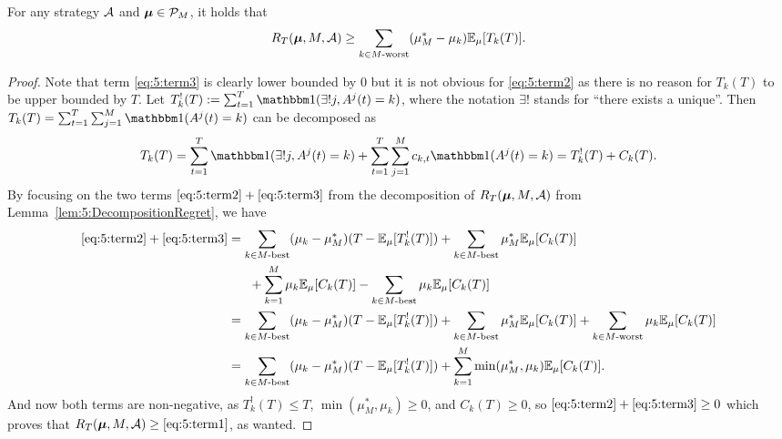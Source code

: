 \begin{lemma}\label{lem:5:1stLowerBound}
\begin{leftbar}[lemmabar]  %
    For any strategy $\mathcal{A}$ and $\boldsymbol{\mu}\in\mathcal{P}_M$, it holds that
    \begin{align*}
        R_T(\boldsymbol{\mu}, M, \mathcal{A})    \geq \sum\limits_{k \in M\text{-}\mathrm{worst}} (\mu_M^*- \mu_k) \mathbb{E}_{\mu}[T_k(T)].
    \end{align*}
\end{leftbar}  %
\end{lemma}

\begin{proof}
  Note that term \ref{eq:5:term3} is clearly lower bounded by $0$
  but it is not obvious for \ref{eq:5:term2} as there is no reason for $T_k(T)$ to be upper bounded by $T$.
  Let $T_k^{!}(T) := \sum_{t=1}^{T} \indic(\exists! j, A^j(t)=k)$,
  where the notation $\exists!$ stands for ``there exists a unique''.
  Then $T_k(T) = \sum_{t=1}^{T} \sum_{j=1}^{M} \indic(A^j(t) = k)$ can be decomposed as
  \begin{equation*}
    T_k(T) = \sum_{t=1}^{T} \indic(\exists! j, A^j(t) = k) + \sum_{t=1}^{T} \sum_{j=1}^{M} c_{k,t} \indic(A^j(t) = k)
    = T_k^{!}(T) + C_k(T).
  \end{equation*}
  By focusing on the two terms $\ref{eq:5:term2} + \ref{eq:5:term3}$ from the decomposition of $R_T(\boldsymbol{\mu}, M, \mathcal{A})$ from Lemma~\ref{lem:5:DecompositionRegret}, we have
  \begin{align*}
    \ref{eq:5:term2} + \ref{eq:5:term3} &=
    \sum_{k \in M\text{-}\mathrm{best}} (\mu_k - \mu_M^*) (T - \mathbb{E}_{\mu}[T_k^!(T)])
    + \sum_{k \in M\text{-}\mathrm{best}} \mu_M^* \mathbb{E}_{\mu}[C_k(T)] \\
    & \;\;\;\;\;\; + \sum_{k=1}^{M} \mu_k \mathbb{E}_{\mu}[C_k(T)]
    - \sum_{k \in M\text{-}\mathrm{best}} \mu_k \mathbb{E}_{\mu}[C_k(T)] \\
    &=
    \sum_{k \in M\text{-}\mathrm{best}} (\mu_k - \mu_M^*) (T - \mathbb{E}_{\mu}[T_k^!(T)])
    + \sum_{k \in M\text{-}\mathrm{best}} \mu_M^* \mathbb{E}_{\mu}[C_k(T)]
    + \sum_{k \in M\text{-}\mathrm{worst}} \mu_k \mathbb{E}_{\mu}[C_k(T)] \\
    &=
    \sum_{k \in M\text{-}\mathrm{best}} (\mu_k - \mu_M^*) (T - \mathbb{E}_{\mu}[T_k^!(T)])
    + \sum_{k=1}^{M} \min(\mu_M^*, \mu_k) \mathbb{E}_{\mu}[C_k(T)].
  \end{align*}
  And now both terms are non-negative, as $T_k^!(T) \leq T$, $\min(\mu_M^*, \mu_k)\geq 0$, and $C_k(T) \geq 0$, so $\ref{eq:5:term2} + \ref{eq:5:term3} \geq 0$
  which proves that $R_T(\boldsymbol{\mu}, M, \mathcal{A}) \geq \ref{eq:5:term1}$, as wanted.
\end{proof}


